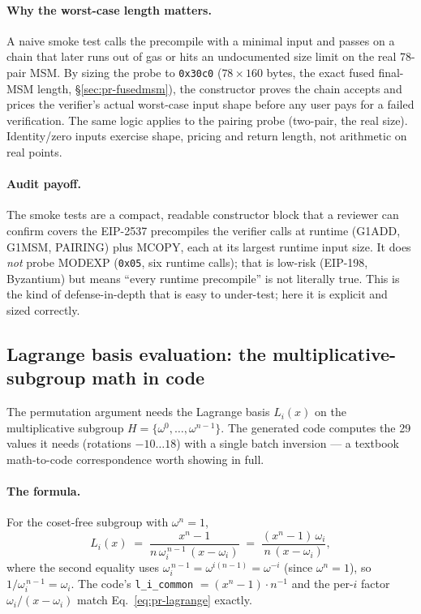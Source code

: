 \paragraph{Why the worst-case length matters.} A naive smoke test
calls the precompile with a minimal input and passes on a chain that
later runs out of gas or hits an undocumented size limit on the real
78-pair MSM. By sizing the probe to \texttt{0x30c0} ($78\times160$
bytes, the exact fused final-MSM length, \S\ref{sec:pr-fusedmsm}), the
constructor proves the chain accepts and prices the verifier's actual
worst-case input shape before any user pays for a failed verification.
The same logic applies to the pairing probe (two-pair, the real size).
Identity/zero inputs exercise shape, pricing and return length, not
arithmetic on real points.

\paragraph{Audit payoff.} The smoke tests are a compact, readable
constructor block that a reviewer can confirm covers the EIP-2537
precompiles the verifier calls at runtime (G1ADD, G1MSM, PAIRING) plus
MCOPY, each at its largest runtime input size.  It does
\emph{not} probe MODEXP (\texttt{0x05}, six runtime calls); that is
low-risk (EIP-198, Byzantium) but means ``every runtime precompile'' is
not literally true. This is the kind of
defense-in-depth that is easy to under-test; here it is explicit and
sized correctly.

\subsection{Lagrange basis evaluation: the multiplicative-subgroup math in code}
\label{sec:pr-lagrange}

The permutation argument needs the Lagrange basis
$L_i(x)$ on the multiplicative subgroup
$H=\{\omega^0,\dots,\omega^{n-1}\}$. The generated code computes
the 29 values it needs (rotations $-10\ldots18$) with a single batch
inversion --- a textbook
math-to-code correspondence worth showing in full.

\paragraph{The formula.} For the coset-free subgroup with
$\omega^n=1$,
\begin{equation}
L_i(x) \;=\; \frac{x^n-1}{n\,\omega_i^{\,n-1}\,(x-\omega_i)}
\;=\; \frac{(x^n-1)\,\omega_i}{n\,(x-\omega_i)},
\label{eq:pr-lagrange}
\end{equation}
where the second equality uses
$\omega_i^{\,n-1}=\omega^{i(n-1)}=\omega^{-i}$ (since
$\omega^n=1$), so $1/\omega_i^{\,n-1}=\omega_i$. The code's
\texttt{l\_i\_common} $=(x^n-1)\cdot n^{-1}$ and the per-$i$ factor
$\omega_i/(x-\omega_i)$ match Eq.~\eqref{eq:pr-lagrange} exactly.

